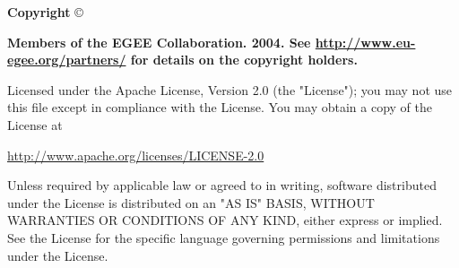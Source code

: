 %
%
%
\vfill{}

{\bf
Copyright} \copyright\ {\bf Members of the EGEE Collaboration. 2004.  See
\href{http://www.eu-egee.org/partners/}{http://www.eu-egee.org/partners/} for
details on the copyright holders.  

Licensed under the Apache License, Version 2.0 (the "License"); you may not use
this file except in compliance with the License.  You may obtain a copy of the
License at 

\begin{center}
\href{http://www.apache.org/licenses/LICENSE-2.0}{http://www.apache.org/licenses/LICENSE-2.0}
\end{center}

Unless required by applicable law or agreed to in writing, software distributed
under the License is distributed on an "AS IS" BASIS, WITHOUT WARRANTIES OR
CONDITIONS OF ANY KIND, either express or implied.  See the License for the
specific language governing permissions and limitations under the License.
}

